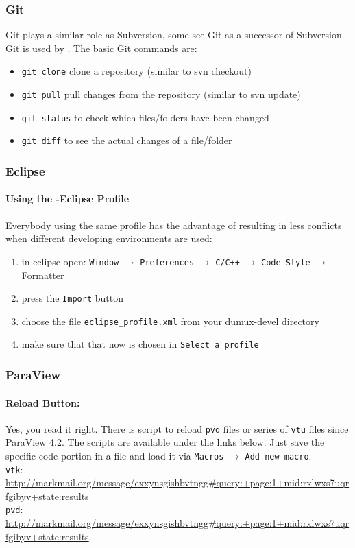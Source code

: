 \subsubsection{Git}
Git plays a similar role as Subversion, some see Git as a successor of Subversion. Git is used by \Dune. The basic
Git commands are:
\begin{itemize}
  \item \texttt{git clone} clone a repository (similar to svn checkout)
  \item \texttt{git pull} pull changes from the repository (similar to svn update)
  \item \texttt{git status} to check which files/folders have been changed
  \item \texttt{git diff} to see the actual changes of a file/folder
\end{itemize}

\subsubsection{Eclipse}
\paragraph{Using the \Dumux-Eclipse Profile}
Everybody using the same profile has the advantage of resulting in less conflicts
when different developing environments are used:
\begin{enumerate}
  \item in eclipse open: \texttt{Window} $\rightarrow$ \texttt{Preferences} $\rightarrow$ \texttt{C/C++}  $\rightarrow$ \texttt{Code Style} $\rightarrow$ Formatter
  \item press the \texttt{Import} button
  \item choose the file \texttt{eclipse\_profile.xml} from your dumux-devel directory
  \item make sure that that now \Dumux is chosen in \texttt{Select a profile}
\end{enumerate}


\subsubsection{ParaView}
\paragraph{Reload Button:}
Yes, you read it right. There is script to reload \texttt{pvd} files or
series of \texttt{vtu} files since ParaView 4.2. The scripts are available
under the links below. Just save the specific code portion in a file and load
it via \texttt{Macros} $\rightarrow$ \texttt{Add new macro}.\\
\texttt{vtk}: \url{http://markmail.org/message/exxynsgishbvtngg#query:+page:1+mid:rxlwxs7uqrfgibyv+state:results}\\
\texttt{pvd}: \url{http://markmail.org/message/exxynsgishbvtngg#query:+page:1+mid:rxlwxs7uqrfgibyv+state:results}.

